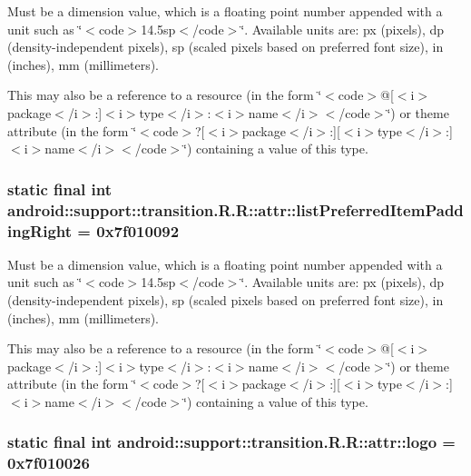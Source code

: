 Must be a dimension value, which is a floating point number appended with a unit such as \char`\"{}$<$code$>$14.5sp$<$/code$>$\char`\"{}. Available units are: px (pixels), dp (density-independent pixels), sp (scaled pixels based on preferred font size), in (inches), mm (millimeters). 

This may also be a reference to a resource (in the form \char`\"{}$<$code$>$@\mbox{[}$<$i$>$package$<$/i$>$:\mbox{]}$<$i$>$type$<$/i$>$:$<$i$>$name$<$/i$>$$<$/code$>$\char`\"{}) or theme attribute (in the form \char`\"{}$<$code$>$?\mbox{[}$<$i$>$package$<$/i$>$:\mbox{]}\mbox{[}$<$i$>$type$<$/i$>$:\mbox{]}$<$i$>$name$<$/i$>$$<$/code$>$\char`\"{}) containing a value of this type. \hypertarget{classandroid_1_1support_1_1transition_1_1_r_1_1attr_cbfb355cbdc23c913d1136f856a6058f}{
\subsubsection[{listPreferredItemPaddingRight}]{\setlength{\rightskip}{0pt plus 5cm}static final int android::support::transition.R.R::attr::listPreferredItemPaddingRight = 0x7f010092}}
\label{classandroid_1_1support_1_1transition_1_1_r_1_1attr_cbfb355cbdc23c913d1136f856a6058f}


Must be a dimension value, which is a floating point number appended with a unit such as \char`\"{}$<$code$>$14.5sp$<$/code$>$\char`\"{}. Available units are: px (pixels), dp (density-independent pixels), sp (scaled pixels based on preferred font size), in (inches), mm (millimeters). 

This may also be a reference to a resource (in the form \char`\"{}$<$code$>$@\mbox{[}$<$i$>$package$<$/i$>$:\mbox{]}$<$i$>$type$<$/i$>$:$<$i$>$name$<$/i$>$$<$/code$>$\char`\"{}) or theme attribute (in the form \char`\"{}$<$code$>$?\mbox{[}$<$i$>$package$<$/i$>$:\mbox{]}\mbox{[}$<$i$>$type$<$/i$>$:\mbox{]}$<$i$>$name$<$/i$>$$<$/code$>$\char`\"{}) containing a value of this type. \hypertarget{classandroid_1_1support_1_1transition_1_1_r_1_1attr_4e21c8d5e3272c8c4683a1992622346e}{
\subsubsection[{logo}]{\setlength{\rightskip}{0pt plus 5cm}static final int android::support::transition.R.R::attr::logo = 0x7f010026}}
\label{classandroid_1_1support_1_1transition_1_1_r_1_1attr_4e21c8d5e3272c8c4683a1992622346e}


